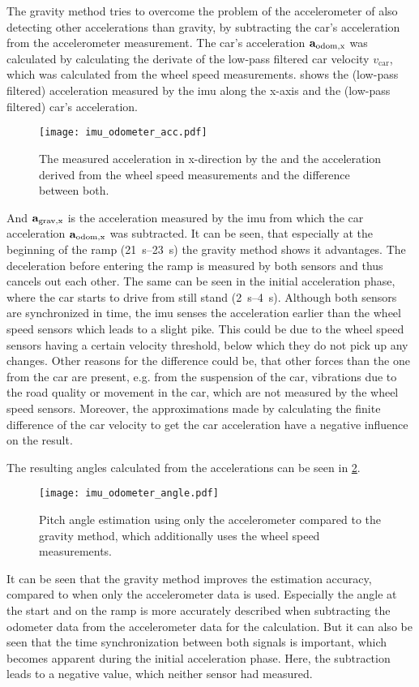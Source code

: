 The gravity method tries to overcome the problem of the accelerometer of also detecting other accelerations than gravity, by subtracting the car's acceleration from the accelerometer measurement.
The car's acceleration $\vb{a}_\mathrm{odom,x} $ was calculated by calculating the derivate of the low-pass filtered car velocity $v_\mathrm{car} $, which was calculated from the wheel speed measurements.
 shows the (low-pass filtered) acceleration measured by the \gls{imu} along the x-axis and the (low-pass filtered) car's acceleration.
\begin{figure}[htb]
    \centering
    \texttt{[image: imu\_odometer\_acc.pdf]}
    \caption[ and wheel speed sensors measured acceleration]{The measured acceleration in x-direction by the  and the acceleration derived from the wheel speed measurements and the difference between both.}
    \label{fig:imu_odometer_acc}
\end{figure}
And $\vb{a}_\mathrm{grav,x} $ is the acceleration measured by the \gls{imu} from which the car acceleration $\vb{a}_\mathrm{odom,x} $ was subtracted.
It can be seen, that especially at the beginning of the ramp (\SIrange{21}{23}{\second}) the gravity method shows it advantages.
The deceleration before entering the ramp is measured by both sensors and thus cancels out each other.
The same can be seen in the initial acceleration phase, where the car starts to drive from still stand (\SIrange[]{2}{4}{\second}).
Although both sensors are synchronized in time, the \gls{imu} senses the acceleration earlier than the wheel speed sensors which leads to a slight pike.
This could be due to the wheel speed sensors having a certain velocity threshold, below which they do not pick up any changes.
Other reasons for the difference could be, that other forces than the one from the car are present, e.g. from the suspension of the car, vibrations due to the road quality or movement in the car, which are not measured by the wheel speed sensors.
Moreover, the approximations made by calculating the finite difference of the car velocity to get the car acceleration have a negative influence on the result.

The resulting angles calculated from the accelerations can be seen in \cref{fig:imu_odometer_angle}.
\begin{figure}[htb]
    \centering
    \texttt{[image: imu\_odometer\_angle.pdf]}
    \caption[ angle estimation using the gravity method]{Pitch angle estimation using only the accelerometer compared to the gravity method, which additionally uses the wheel speed measurements.}
    \label{fig:imu_odometer_angle}
\end{figure}
It can be seen that the gravity method improves the estimation accuracy, compared to when only the accelerometer data is used.
Especially the angle at the start and on the ramp is more accurately described when subtracting the odometer data from the accelerometer data for the calculation.
But it can also be seen that the time synchronization between both signals is important, which becomes apparent during the initial acceleration phase.
Here, the subtraction leads to a negative value, which neither sensor had measured.


